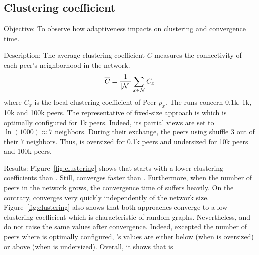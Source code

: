 \subsection{Clustering coefficient}
\label{subsec:cluster}


\begin{asparadesc}
\item[Objective:] To observe how adaptiveness impacts on clustering and
  convergence time.
\item[Description:] The average clustering coefficient $\overline{C}$ measures
  the connectivity of each peer's neighborhood in the network.
  \begin{equation}
    \overline{C} = {1\over |\mathcal{N}|}\sum\limits_{x\in\mathcal{N}}C_x
  \end{equation}
  where $C_x$ is the local clustering coefficient of Peer $p_x$.  The runs
  concern 0.1k, 1k, 10k and 100k peers. The representative of fixed-size
  approach is \CYCLON which is optimally configured for 1k peers. Indeed, its
  partial views are set to $\ln(1000)\approx 7$ neighbors. During their
  exchange, the peers using \CYCLON shuffle $3$ out of their $7$
  neighbors. Thus, \CYCLON is oversized for 0.1k peers and undersized for 10k
  peers and 100k peers.
\item[Results:] Figure~\ref{fig:clustering} shows that \CYCLON starts with a
  lower clustering coefficients than \SPRAY. Still, \SPRAY converges faster
  than \CYCLON. Furthermore, when the number of peers in the network grows, the
  convergence time of \CYCLON suffers heavily. On the contrary, \SPRAY
  converges very quickly independently of the network
  size. Figure~\ref{fig:clustering} also shows that both approaches
  converge to a low clustering coefficient which is characteristic of random
  graphs. Nevertheless, \CYCLON and \SPRAY do not raise the same values after
  convergence. Indeed, excepted the number of peers where \CYCLON is optimally
  configured, \SPRAY's values are either below (when \CYCLON is oversized) or
  above (when \CYCLON is undersized).  Overall, it shows that \SPRAY is
  \begin{inparaenum}

\end{inparaenum}
\end{asparadesc}
